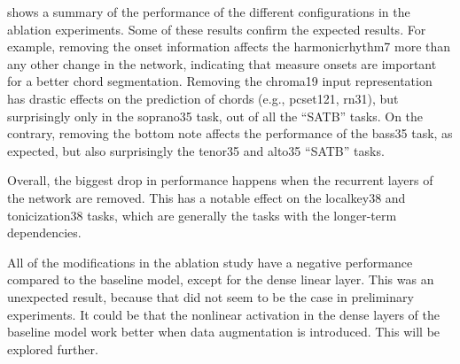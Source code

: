 

 shows a summary of the performance of the
different configurations in the ablation experiments. Some
of these results confirm the expected results. For example,
removing the onset information affects the
\gls{harmonicrhythm7} more than any other change in the
network, indicating that measure onsets are important for a
better chord segmentation. Removing the \gls{chroma19} input
representation has drastic effects on the prediction of
chords (e.g., \gls{pcset121}, \gls{rn31}), but surprisingly
only in the \gls{soprano35} task, out of all the ``SATB''
tasks. On the contrary, removing the bottom note affects the
performance of the \gls{bass35} task, as expected, but also
surprisingly the \gls{tenor35} and \gls{alto35} ``SATB''
tasks.

Overall, the biggest drop in performance happens when the
recurrent layers of the network are removed. This has a
notable effect on the \gls{localkey38} and
\gls{tonicization38} tasks, which are generally the tasks
with the longer-term dependencies. 

All of the modifications in the ablation study have a
negative performance compared to the baseline model, except
for the dense linear layer. This was an unexpected result,
because that did not seem to be the case in preliminary
experiments. It could be that the nonlinear activation in
the dense layers of the baseline model work better when data
augmentation is introduced. This will be explored further.
